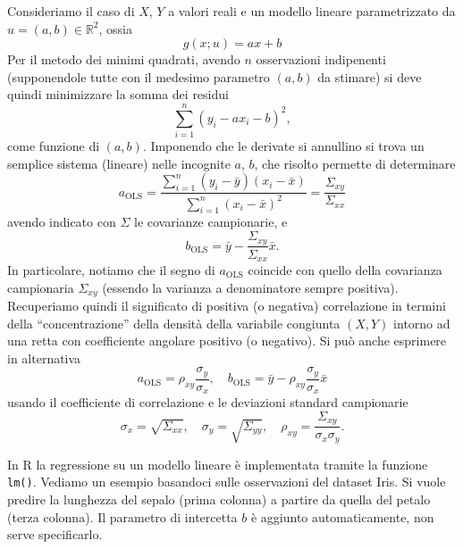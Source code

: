 \documentclass[
  italian,
  letterpaper,
]{book}
\newenvironment{Shaded}{\begin{snugshade}}{\end{snugshade}}
\newcommand{\CommentTok}[1]{\textcolor[rgb]{0.37,0.37,0.37}{#1}}
\newcommand{\FunctionTok}[1]{\textcolor[rgb]{0.28,0.35,0.67}{#1}}
\newcommand{\NormalTok}[1]{\textcolor[rgb]{0.00,0.23,0.31}{#1}}
\newcommand{\OtherTok}[1]{\textcolor[rgb]{0.00,0.23,0.31}{#1}}
\newcommand{\SpecialCharTok}[1]{\textcolor[rgb]{0.37,0.37,0.37}{#1}}
\newcommand{\R}{\mathbb{R}}
\newcommand{\ols}{\operatorname{OLS}}
\theoremstyle{definition}
\theoremstyle{remark}
\begin{document}
Consideriamo il caso di \(X\), \(Y\) a valori reali e un modello lineare
parametrizzato da \(u=(a,b) \in \R^2\), ossia \[ g(x; u) = ax +b\] Per
il metodo dei minimi quadrati, avendo \(n\) osservazioni indipenenti
(supponendole tutte con il medesimo parametro \((a,b)\) da stimare) si
deve quindi minimizzare la somma dei residui
\[ \sum_{i=1}^n (y_i - a x_i -b)^2,\] come funzione di \((a,b)\).
Imponendo che le derivate si annullino si trova un semplice sistema
(lineare) nelle incognite \(a\), \(b\), che risolto permette di
determinare
\[ a_{\ols} = \frac{  \sum_{i=1}^n(y_i - \bar{y})(x_i - \bar{x})}{ \sum_{i=1}^n (x_i- \bar{x})^2} = \frac{ \Sigma_{xy}}{\Sigma_{xx}}\]
avendo indicato con \(\Sigma\) le covarianze campionarie, e
\[ b_{\ols} = \bar{y} - \frac{ \Sigma_{xy}}{\Sigma_{xx}} \bar{x}.\] In
particolare, notiamo che il segno di \(a_{\ols}\) coincide con quello
della covarianza campionaria \(\Sigma_{xy}\) (essendo la varianza a
denominatore sempre positiva). Recuperiamo quindi il significato di
positiva (o negativa) correlazione in termini della ``concentrazione''
della densità della variabile congiunta \((X,Y)\) intorno ad una retta
con coefficiente angolare positivo (o negativo). Si può anche esprimere
in alternativa
\[ a_{\ols} = \rho_{xy} \frac{\sigma_y}{\sigma_x}, \quad b_{\ols} = \bar{y} - \rho_{xy} \frac{ \sigma_y}{\sigma_x} \bar{x}\]
usando il coefficiente di correlazione e le deviazioni standard
campionarie
\[ \sigma_x = \sqrt{ \Sigma_{xx}}, \quad \sigma_y = \sqrt{ \Sigma_{yy}}, \quad \rho_{xy} = \frac{\Sigma_{xy}}{\sigma_x \sigma_y}.\]

In R la regressione su un modello lineare è implementata tramite la
funzione \texttt{lm()}. Vediamo un esempio basandoci sulle osservazioni
del dataset Iris. Si vuole predire la lunghezza del sepalo (prima
colonna) a partire da quella del petalo (terza colonna). Il parametro di
intercetta \(b\) è aggiunto automaticamente, non serve specificarlo.

\begin{Shaded}
\end{Shaded}
\end{document}
